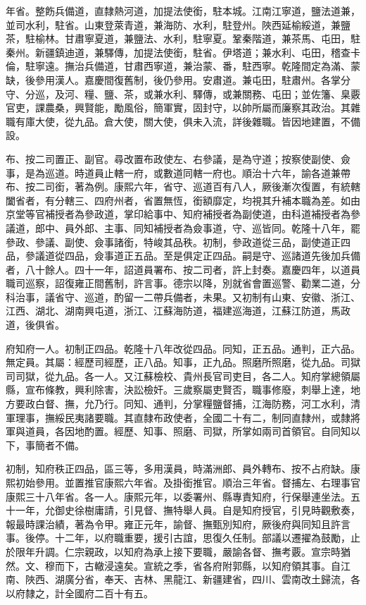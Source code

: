 \begin{pinyinscope}
年省。整飭兵備道，直隸熱河道，加提法使銜，駐本城。江南江寧道，鹽法道兼，並司水利，駐省。山東登萊青道，兼海防、水利，駐登州。陜西延榆綏道，兼鹽茶，駐榆林。甘肅寧夏道，兼鹽法、水利，駐寧夏。鞏秦階道，兼茶馬、屯田，駐秦州。新疆鎮迪道，兼驛傳，加提法使銜，駐省。伊塔道；兼水利、屯田，稽查卡倫，駐寧遠。撫治兵備道，甘肅西寧道，兼治蒙、番，駐西寧。乾隆間定為滿、蒙缺，後參用漢人。嘉慶間復舊制，後仍參用。安肅道。兼屯田，駐肅州。各掌分守、分巡，及河、糧、鹽、茶，或兼水利、驛傳，或兼關務、屯田；並佐籓、臬覈官吏，課農桑，興賢能，勵風俗，簡軍實，固封守，以帥所屬而廉察其政治。其雜職有庫大使，從九品。倉大使，關大使，俱未入流，詳後雜職。皆因地建置，不備設。

布、按二司置正、副官。尋改置布政使左、右參議，是為守道；按察使副使、僉事，是為巡道。時道員止轄一府，或數道同轄一府也。順治十六年，諭各道兼帶布、按二司銜，著為例。康熙六年，省守、巡道百有八人，厥後漸次復置，有統轄闔省者，有分轄三、四府州者，省置無恆，銜額靡定，均視其升補本職為差。如由京堂等官補授者為參政道，掌印給事中、知府補授者為副使道，由科道補授者為參議道，郎中、員外郎、主事、同知補授者為僉事道，守、巡皆同。乾隆十八年，罷參政、參議、副使、僉事諸銜，特峻其品秩。初制，參政道從三品，副使道正四品，參議道從四品，僉事道正五品。至是俱定正四品。嗣是守、巡諸道先後加兵備者，八十餘人。四十一年，詔道員署布、按二司者，許上封奏。嘉慶四年，以道員職司巡察，詔復雍正間舊制，許言事。德宗以降，別就省會置巡警、勸業二道，分科治事，議省守、巡道，酌留一二帶兵備者，未果。又初制有山東、安徽、浙江、江西、湖北、湖南興屯道，浙江、江蘇海防道，福建巡海道，江蘇江防道，馬政道，後俱省。

府知府一人。初制正四品。乾隆十八年改從四品。同知，正五品。通判，正六品。無定員。其屬：經歷司經歷，正八品。知事，正九品。照磨所照磨，從九品。司獄司司獄，從九品。各一人。又江蘇檢校、貴州長官司吏目，各二人。知府掌總領屬縣，宣布條教，興利除害，決訟檢奸。三歲察屬吏賢否，職事修廢，刺舉上達，地方要政白督、撫，允乃行。同知、通判，分掌糧鹽督捕，江海防務，河工水利，清軍理事，撫綏民夷諸要職。其直隸布政使者，全國二十有二，制同直隸州，或隸將軍與道員，各因地酌置。經歷、知事、照磨、司獄，所掌如兩司首領官。自同知以下，事簡者不備。

初制，知府秩正四品，區三等，多用漢員，時滿洲郎、員外轉布、按不占府缺。康熙初始參用。並置推官康熙六年省。及掛銜推官。順治三年省。督捕左、右理事官康熙三十八年省。各一人。康熙元年，以委署州、縣專責知府，行保舉連坐法。五十一年，允御史徐樹庸請，引見督、撫特舉人員。自是知府授官，引見時觀敷奏，報最時課治績，著為令甲。雍正元年，諭督、撫甄別知府，厥後府與同知且許言事。後停。十二年，以府職重要，援引古誼，思復久任制。部議以遷擢為鼓勵，止於限年升調。仁宗親政，以知府為承上接下要職，嚴諭各督、撫考覈。宣宗時猶然。文、穆而下，古轍浸遠矣。宣統之季，省各府附郭縣，以知府領其事。自江南、陜西、湖廣分省，奉天、吉林、黑龍江、新疆建省，四川、雲南改土歸流，各以府隸之，計全國府二百十有五。


\end{pinyinscope}
